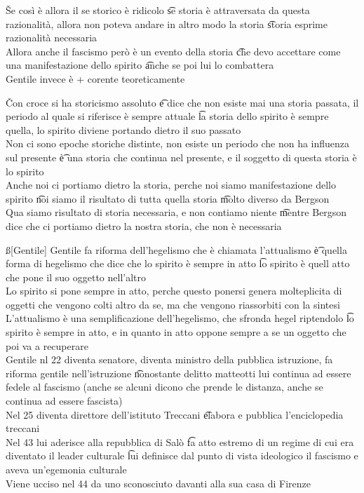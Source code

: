 \documentclass[12pt]{article}
\begin{document}
\v

Se così è allora il se storico è ridicolo \t se storia è attraversata da questa razionalità, allora non poteva andare in altro modo la storia \t storia esprime razionalità necessaria \\
Allora anche il fascismo però è un evento della storia \t che devo accettare come una manifestazione dello spirito \t anche se poi lui lo combattera \\
Gentile invece è + corente teoreticamente

\v

Con croce si ha storicismo assoluto \t e dice che non esiste mai una storia passata, il periodo al quale si riferisce è sempre attuale \t la storia dello spirito è sempre quella, lo spirito diviene portando dietro il suo passato \\
Non ci sono epoche storiche distinte, non esiste un periodo che non ha influenza sul presente \t è una storia che continua nel presente, e il soggetto di questa storia è lo spirito \\
Anche noi ci portiamo dietro la storia, perche noi siamo manifestazione dello spirito \t noi siamo il risultato di tutta quella storia \t molto diverso da Bergson \\
Qua siamo risultato di storia necessaria, e non contiamo niente \t mentre Bergson dice che ci portiamo dietro la nostra storia, che non è necessaria

\ss[Gentile]
Gentile fa riforma dell'hegelismo che è chiamata l'attualismo \t è quella forma di hegelismo che dice che lo spirito è sempre in atto \t lo spirito è quell atto che pone il suo oggetto nell'altro \\
Lo spirito si pone sempre in atto, perche questo ponersi genera molteplicita di oggetti che vengono colti altro da se, ma che vengono riassorbiti con la sintesi \\
L'attualismo è una semplificazione dell'hegelismo, che sfronda hegel riptendolo \t lo spirito è sempre in atto, e in quanto in atto oppone sempre a se un oggetto che poi va a recuperare \\
Gentile nl 22 diventa senatore, diventa ministro della pubblica istruzione, fa riforma gentile nell'istruzione \t nonostante delitto matteotti lui continua ad essere fedele al fascismo (anche se alcuni dicono che prende le distanza, anche se continua ad essere fascista) \\
Nel 25 diventa direttore dell'istituto Treccani \t elabora e pubblica l'enciclopedia treccani \\
Nel 43 lui aderisce alla repubblica di Salò \t fa atto estremo di un regime di cui era diventato il leader culturale \t lui definisce dal punto di vista ideologico il fascismo e aveva un'egemonia culturale \\
Viene ucciso nel 44 da uno sconosciuto davanti alla sua casa di Firenze
\end{document}
